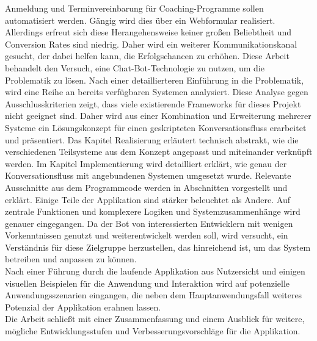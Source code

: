 \kurzfassung

Anmeldung und Terminvereinbarung für Coaching-Programme sollen automatisiert werden. Gängig wird dies über ein Webformular realisiert. Allerdings erfreut sich diese Herangehensweise keiner großen Beliebtheit und Conversion Rates sind niedrig. Daher wird ein weiterer Kommunikationskanal gesucht, der dabei helfen kann, die Erfolgschancen zu erhöhen. Diese Arbeit behandelt den Versuch, eine Chat-Bot-Technologie zu nutzen, um die Problematik zu lösen. Nach einer detaillierteren Einführung in die Problematik, wird eine Reihe an bereits verfügbaren Systemen analysiert. Diese Analyse gegen Ausschlusskriterien zeigt, dass viele existierende Frameworks für dieses Projekt nicht geeignet sind. Daher wird aus einer Kombination und Erweiterung mehrerer Systeme ein Lösungskonzept für einen geskripteten Konversationsfluss erarbeitet und präsentiert. Das Kapitel Realisierung erläutert technisch abstrakt, wie die verschiedenen Teilsysteme aus dem Konzept angepasst und miteinander verknüpft werden. Im Kapitel Implementierung wird detailliert erklärt, wie genau der Konversationsfluss mit angebundenen Systemen umgesetzt wurde. Relevante Ausschnitte aus dem Programmcode werden in Abschnitten vorgestellt und erklärt. Einige Teile der Applikation sind stärker beleuchtet als Andere. Auf zentrale Funktionen und komplexere Logiken und Systemzusammenhänge wird genauer eingegangen. Da der Bot von interessierten Entwicklern mit wenigen Vorkenntnissen genutzt und weiterentwickelt werden soll, wird versucht, ein Verständnis für diese Zielgruppe herzustellen, das hinreichend ist, um das System betreiben und anpassen zu können. \\
Nach einer Führung durch die laufende Applikation aus Nutzersicht und einigen visuellen Beispielen für die Anwendung und Interaktion wird auf potenzielle Anwendungsszenarien eingangen, die neben dem Hauptanwendungsfall weiteres Potenzial der Applikation erahnen lassen. \\
Die Arbeit schließt mit einer Zusammenfassung und einem Ausblick für weitere, mögliche Entwicklungsstufen und Verbesserungsvorschläge für die Applikation. 

\kurzfassungEN

